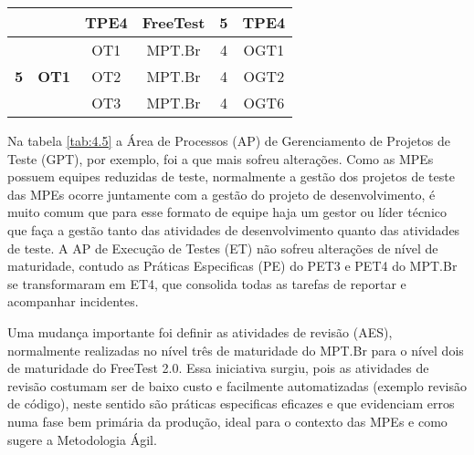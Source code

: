 \begin{table}[H]
{\begin{tabular}{|c|c|c|c|c|c|}
                                                                                &                               & TPE4        & \textbf{FreeTest} & 5                                                                                  & TPE4                                                                      \\ \hline
\multirow{3}{*}{\textbf{5}}                                                     & \multirow{3}{*}{\textbf{OT1}} & OT1         & MPT.Br            & 4                                                                                  & OGT1                                                                      \\ \cline{3-6} 
                                                                                &                               & OT2         & MPT.Br            & 4                                                                                  & OGT2                                                                      \\ \cline{3-6} 
                                                                                &                               & OT3         & MPT.Br            & 4                                                                                  & OGT6                                                                      \\ \hline
\end{tabular}
}
\end{table}

Na tabela \ref{tab:4.5} a Área de Processos (AP) de Gerenciamento de Projetos de Teste (GPT), por exemplo, foi a que mais sofreu alterações. Como as MPEs possuem equipes reduzidas de teste, normalmente a gestão dos projetos de teste das MPEs ocorre juntamente com a gestão do projeto de desenvolvimento, é muito comum que para esse formato de equipe haja um gestor ou líder técnico que faça a gestão tanto das atividades de desenvolvimento quanto das atividades de teste. A AP de Execução de Testes (ET) não sofreu alterações de nível de maturidade, contudo as Práticas Especificas (PE) do PET3 e PET4 do MPT.Br se transformaram em ET4, que consolida todas as tarefas de reportar e acompanhar incidentes.

Uma mudança importante foi definir as atividades de revisão (AES), normalmente realizadas no nível três de maturidade do MPT.Br para o nível dois de maturidade do FreeTest 2.0. Essa iniciativa surgiu, pois as atividades de revisão costumam ser de baixo custo e facilmente automatizadas (exemplo revisão de código), neste sentido são práticas especificas eficazes e que evidenciam erros numa fase bem primária da produção, ideal para o contexto das MPEs e como sugere a Metodologia Ágil.


